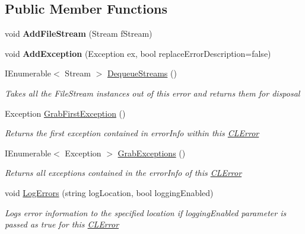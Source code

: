 \subsection*{Public Member Functions}
\begin{DoxyCompactItemize}
\item 
\hypertarget{class_cloud_api_public_1_1_model_1_1_c_l_error_a1d9c11f935bc256bf2ef4b166eeee77f}{void {\bfseries Add\-File\-Stream} (Stream f\-Stream)}\label{class_cloud_api_public_1_1_model_1_1_c_l_error_a1d9c11f935bc256bf2ef4b166eeee77f}

\item 
\hypertarget{class_cloud_api_public_1_1_model_1_1_c_l_error_a4e663afbfc99de8521f9a9440b3eb410}{void {\bfseries Add\-Exception} (Exception ex, bool replace\-Error\-Description=false)}\label{class_cloud_api_public_1_1_model_1_1_c_l_error_a4e663afbfc99de8521f9a9440b3eb410}

\item 
I\-Enumerable$<$ Stream $>$ \hyperlink{class_cloud_api_public_1_1_model_1_1_c_l_error_a7c13631040d4109222701c2869de8e08}{Dequeue\-Streams} ()
\begin{DoxyCompactList}\small\item\em Takes all the File\-Stream instances out of this error and returns them for disposal \end{DoxyCompactList}\item 
Exception \hyperlink{class_cloud_api_public_1_1_model_1_1_c_l_error_add9bcf1572e5b8777988ee71fe3667c7}{Grab\-First\-Exception} ()
\begin{DoxyCompactList}\small\item\em Returns the first exception contained in error\-Info within this \hyperlink{class_cloud_api_public_1_1_model_1_1_c_l_error}{C\-L\-Error} \end{DoxyCompactList}\item 
I\-Enumerable$<$ Exception $>$ \hyperlink{class_cloud_api_public_1_1_model_1_1_c_l_error_a7bccb3f868f332915fe9b5bbcd5cfde3}{Grab\-Exceptions} ()
\begin{DoxyCompactList}\small\item\em Returns all exceptions contained in the error\-Info of this \hyperlink{class_cloud_api_public_1_1_model_1_1_c_l_error}{C\-L\-Error} \end{DoxyCompactList}\item 
void \hyperlink{class_cloud_api_public_1_1_model_1_1_c_l_error_a9aac3e16ec24c2e9008f711187730cd9}{Log\-Errors} (string log\-Location, bool logging\-Enabled)
\begin{DoxyCompactList}\small\item\em Logs error information to the specified location if logging\-Enabled parameter is passed as true for this \hyperlink{class_cloud_api_public_1_1_model_1_1_c_l_error}{C\-L\-Error} \end{DoxyCompactList}\end{DoxyCompactItemize}
